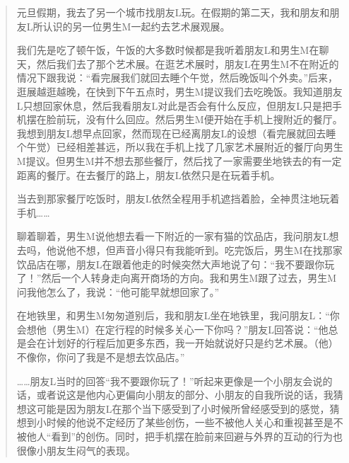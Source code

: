 \blockquote{
元旦假期，我去了另一个城市找朋友L玩。在假期的第二天，我和朋友和朋友L所认识的另一位男生M一起约去艺术展观展。

我们先是吃了顿午饭，午饭的大多数时候都是我听着朋友L和男生M在聊天，然后我们去了那个艺术展。在逛艺术展时，朋友L在男生M不在附近的情况下跟我说：“看完展我们就回去睡个午觉，然后晚饭叫个外卖。”后来，逛展越逛越晚，在快到下午五点时，男生M提议我们去吃晚饭。我知道朋友L只想回家休息，然后我看朋友L对此是否会有什么反应，但朋友L只是把手机摆在脸前玩，没有什么回应。然后男生M便开始在手机上搜附近的餐厅。我想到朋友L想早点回家，然而现在已经离朋友L的设想（看完展就回去睡个午觉）已经相差甚远，所以我在手机上找了几家艺术展附近的餐厅向男生M提议。但男生M并不想去那些餐厅，然后找了一家需要坐地铁去的有一定距离的餐厅。在去餐厅的路上，朋友L依然只是在玩着手机。

当去到那家餐厅吃饭时，朋友L依然全程用手机遮挡着脸，全神贯注地玩着手机……

聊着聊着，男生M说他想去看一下附近的一家有猫的饮品店，我问朋友L想去吗，他说他不想，但声音小得只有我能听到。吃完饭后，男生M在找那家饮品店在哪，朋友L在跟着他走的时候突然大声地说了句：“我不要跟你玩了！”然后一个人转身走向离开商场的方向。我和男生M跟了过去，男生M问我他怎么了，我说：“他可能早就想回家了。”

在地铁里，和男生M匆匆道别后，我和朋友L坐在地铁里，我问朋友L：“你会想他（男生M）在定行程的时候多关心一下你吗？”朋友L回答说：“他总是会在计划好的行程后加更多东西，我一开始就说好只是约艺术展。（他）不像你，你问了我是不是想去饮品店。”

……朋友L当时的回答“我不要跟你玩了！”听起来更像是一个小朋友会说的话，或者说这是他内心更偏向小朋友的部分、小朋友的自我所说的话，我猜想这可能是因为朋友L在那个当下感受到了小时候所曾经感受到的感觉，猜想到小时候的他说不定经历了某些创伤，一些不被他人关心和重视甚至是不被他人“看到”的创伤。同时，把手机摆在脸前来回避与外界的互动的行为也很像小朋友生闷气的表现。

}

